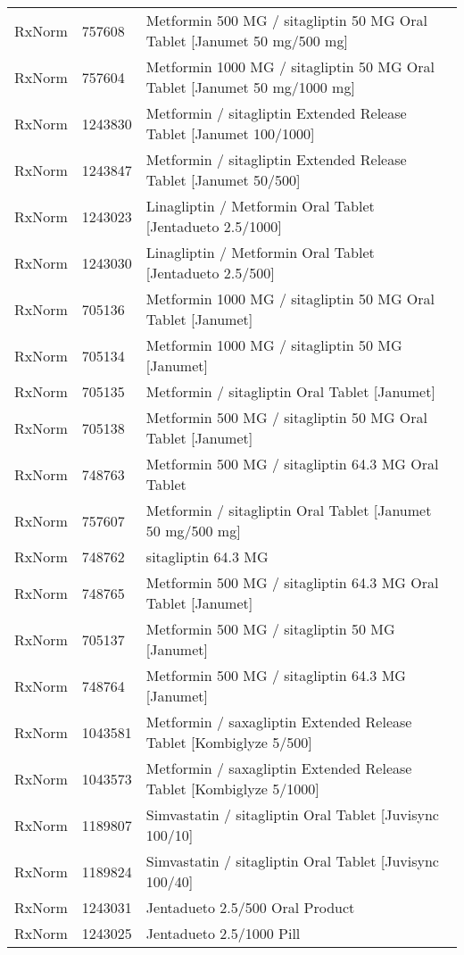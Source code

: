 \begin{longtable}{p{}p{}p{}}
  RxNorm & 757608 & Metformin 500 MG / sitagliptin 50 MG Oral Tablet [Janumet 50 mg/500 mg] \\ 
  RxNorm & 757604 & Metformin 1000 MG / sitagliptin 50 MG Oral Tablet [Janumet 50 mg/1000 mg] \\ 
  RxNorm & 1243830 & Metformin / sitagliptin Extended Release Tablet [Janumet 100/1000] \\ 
  RxNorm & 1243847 & Metformin / sitagliptin Extended Release Tablet [Janumet 50/500] \\ 
  RxNorm & 1243023 & Linagliptin / Metformin Oral Tablet [Jentadueto 2.5/1000] \\ 
  RxNorm & 1243030 & Linagliptin / Metformin Oral Tablet [Jentadueto 2.5/500] \\ 
  RxNorm & 705136 & Metformin 1000 MG / sitagliptin 50 MG Oral Tablet [Janumet] \\ 
  RxNorm & 705134 & Metformin 1000 MG / sitagliptin 50 MG [Janumet] \\ 
  RxNorm & 705135 & Metformin / sitagliptin Oral Tablet [Janumet] \\ 
  RxNorm & 705138 & Metformin 500 MG / sitagliptin 50 MG Oral Tablet [Janumet] \\ 
  RxNorm & 748763 & Metformin 500 MG / sitagliptin 64.3 MG Oral Tablet \\ 
  RxNorm & 757607 & Metformin / sitagliptin Oral Tablet [Janumet 50 mg/500 mg] \\ 
  RxNorm & 748762 & sitagliptin 64.3 MG \\ 
  RxNorm & 748765 & Metformin 500 MG / sitagliptin 64.3 MG Oral Tablet [Janumet] \\ 
  RxNorm & 705137 & Metformin 500 MG / sitagliptin 50 MG [Janumet] \\ 
  RxNorm & 748764 & Metformin 500 MG / sitagliptin 64.3 MG [Janumet] \\ 
  RxNorm & 1043581 & Metformin / saxagliptin Extended Release Tablet [Kombiglyze 5/500] \\ 
  RxNorm & 1043573 & Metformin / saxagliptin Extended Release Tablet [Kombiglyze 5/1000] \\ 
  RxNorm & 1189807 & Simvastatin / sitagliptin Oral Tablet [Juvisync 100/10] \\ 
  RxNorm & 1189824 & Simvastatin / sitagliptin Oral Tablet [Juvisync 100/40] \\ 
  RxNorm & 1243031 & Jentadueto 2.5/500 Oral Product \\ 
  RxNorm & 1243025 & Jentadueto 2.5/1000 Pill \\ 

\end{longtable}
